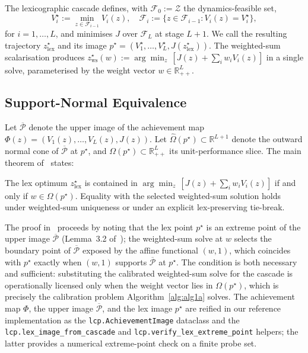 The lexicographic cascade defines, with $\mathcal{F}_0 := \mathcal{Z}$ the dynamics-feasible set,
\begin{equation}
V_i^{\star} := \min_{z \in \mathcal{F}_{i-1}} V_i(z), \quad \mathcal{F}_i := \{z \in \mathcal{F}_{i-1} : V_i(z) = V_i^{\star}\},
\label{eq:cascade}
\end{equation}
for $i = 1, \ldots, L$, and minimises $J$ over $\mathcal{F}_L$ at stage $L+1$. We call the resulting trajectory $z_{\mathrm{lex}}^{\star}$ and its image $p^{\star} = (V_1^{\star}, \ldots, V_L^{\star}, J(z_{\mathrm{lex}}^{\star}))$. The weighted-sum scalarisation produces $z_{\mathrm{ws}}^{\star}(w) := \arg\min_z\, [J(z) + \sum_i w_i V_i(z)]$ in a single solve, parameterised by the weight vector $w \in \mathbb{R}_{++}^{L}$.

\subsection{Support-Normal Equivalence}
\label{sec:foundations:thm1}

Let $\overline{\mathcal{P}}$ denote the upper image of the achievement map $\Phi(z) = (V_1(z), \ldots, V_L(z), J(z))$. Let $\widehat{\Omega}(p^{\star}) \subset \mathbb{R}^{L+1}$ denote the outward normal cone of $\overline{\mathcal{P}}$ at $p^{\star}$, and $\Omega(p^{\star}) \subset \mathbb{R}_{++}^{L}$ its unit-performance slice. The main theorem of~\cite{lcp2025} states:

\begin{theorem}
\label{thm:equivalence}
The lex optimum $z_{\mathrm{lex}}^{\star}$ is contained in $\arg\min_z\, [J(z) + \sum_i w_i V_i(z)]$ if and only if $w \in \Omega(p^{\star})$. Equality with the selected weighted-sum solution holds under weighted-sum uniqueness or under an explicit lex-preserving tie-break.
\end{theorem}

The proof in~\cite[\S4.2]{lcp2025} proceeds by noting that the lex point $p^\star$ is an extreme point of the upper image $\overline{\mathcal{P}}$ (Lemma~3.2 of~\cite{lcp2025}); the weighted-sum solve at $w$ selects the boundary point of $\overline{\mathcal{P}}$ exposed by the affine functional $(w, 1)$, which coincides with $p^\star$ exactly when $(w, 1)$ supports $\overline{\mathcal{P}}$ at $p^\star$. The condition is both necessary and sufficient: substituting the calibrated weighted-sum solve for the cascade is operationally licensed only when the weight vector lies in $\Omega(p^\star)$, which is precisely the calibration problem Algorithm~\ref{alg:alg1a} solves. The achievement map $\Phi$, the upper image $\overline{\mathcal{P}}$, and the lex image $p^\star$ are reified in our reference implementation as the \texttt{lcp.AchievementImage} dataclass and the \texttt{lcp.lex\_image\_from\_cascade} and \texttt{lcp.verify\_lex\_extreme\_point} helpers; the latter provides a numerical extreme-point check on a finite probe set.


